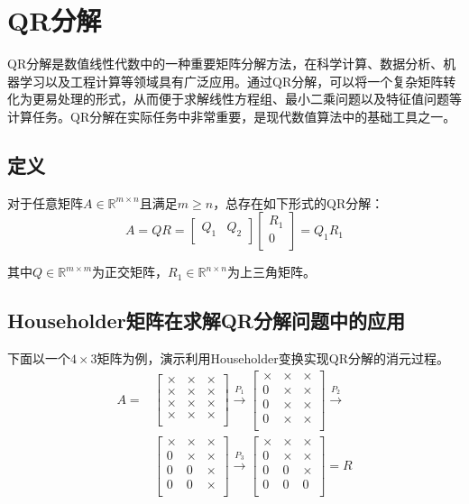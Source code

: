 ﻿\documentclass[UTF8,a4paper,openany]{ctexbook}
\theoremstyle{qrplain}
\begin{document}
\section{QR分解}

QR分解是数值线性代数中的一种重要矩阵分解方法，在科学计算、数据分析、机器学习以及工程计算等领域具有广泛应用。通过QR分解，可以将一个复杂矩阵转化为更易处理的形式，从而便于求解线性方程组、最小二乘问题以及特征值问题等计算任务。QR分解在实际任务中非常重要，是现代数值算法中的基础工具之一。

\subsection{定义}

对于任意矩阵$A\in\mathbb{R}^{m\times n}$且满足$m\ge n$，总存在如下形式的QR分解：
$$A=QR=\left[\begin{matrix}Q_1&Q_2\\\end{matrix}\right]\left[\begin{matrix}R_1\\0\\\end{matrix}\right]=Q_1R_1$$

其中$Q\in\mathbb{R}^{m\times m}$为正交矩阵，$R_1\in\mathbb{R}^{n\times n}$为上三角矩阵。

\subsection{Householder矩阵在求解QR分解问题中的应用}
下面以一个$4\times3$矩阵为例，演示利用Householder变换实现QR分解的消元过程。
\begin{align*}
  A=&\left[\begin{matrix}\times&\times&\times\\\times&\times&\times\\\times&\times&\times\\\times&\times&\times\\\end{matrix}\right]\xrightarrow{P_1}\left[\begin{matrix}\times&\times&\times\\0&\times&\times\\0&\times&\times\\0&\times&\times\\\end{matrix}\right]\xrightarrow{P_2}\\
  &\left[\begin{matrix}\times&\times&\times\\0&\times&\times\\0&0&\times\\0&0&\times\\\end{matrix}\right]\xrightarrow{P_3}\left[\begin{matrix}\times&\times&\times\\0&\times&\times\\0&0&\times\\0&0&0\\\end{matrix}\right]=R
\end{align*}
\end{document}
